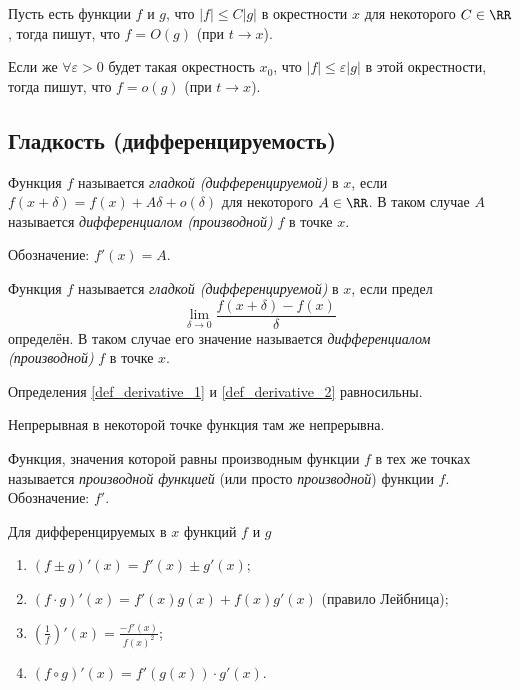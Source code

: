 \documentclass[12pt,a4paper]{article}
\begin{document}
    \begin{definition}
        Пусть есть функции $f$ и $g$, что $|f| \leqslant C|g|$ в окрестности $x$ для некоторого $C \in \RR$, тогда пишут, что $f = O(g)$ (при $t \to x$).
        
        Если же $\forall \varepsilon > 0$ будет такая окрестность $x_0$, что $|f| \leqslant \varepsilon |g|$ в этой окрестности, тогда пишут, что $f = o(g)$ (при $t \to x$).
    \end{definition}

    \subsection{Гладкость (дифференцируемость)}

    \begin{definition}\label{def_derivative_1}
        Функция $f$ называется \emph{гладкой (дифференцируемой)} в $x$, если $f(x + \delta) = f(x) + A \delta + o(\delta)$ для некоторого $A \in \RR$. В таком случае $A$ называется \emph{дифференциалом (производной)} $f$ в точке $x$.

        Обозначение: $f'(x) = A$.
    \end{definition}

    \begin{definition}\label{def_derivative_2}
        Функция $f$ называется \emph{гладкой (дифференцируемой)} в $x$, если предел
        \[\lim\limits_{\delta \to 0} \frac{f(x+\delta) - f(x)}{\delta}\]
        определён. В таком случае его значение называется \emph{дифференциалом (производной)} $f$ в точке $x$.
    \end{definition}

    \begin{statement}
        Определения \ref{def_derivative_1} и \ref{def_derivative_2} равносильны.
    \end{statement}

    \begin{statement}
        Непрерывная в некоторой точке функция там же непрерывна.
    \end{statement}

    \begin{definition}  
        Функция, значения которой равны производным функции $f$ в тех же точках называется \emph{производной функцией} (или просто \emph{производной}) функции $f$. Обозначение: $f'$.
    \end{definition}

    \begin{lemma}
        Для дифференцируемых в $x$ функций $f$ и $g$
        \begin{enumerate}
            \item $(f \pm g)'(x) = f'(x) \pm g'(x)$;
            \item $(f \cdot g)'(x) = f'(x) g(x) + f(x) g'(x)$ (правило Лейбница);
            \item $(\frac{1}{f})'(x) = \frac{-f'(x)}{f(x)^2}$;
            \item $(f \circ g)'(x) = f'(g(x))\cdot g'(x)$.
        \end{enumerate}
    \end{lemma}
\end{document}

